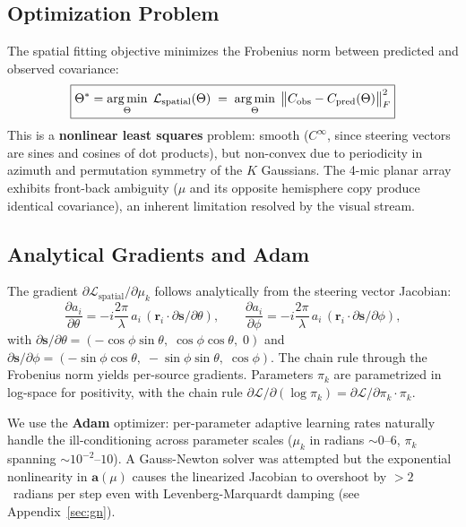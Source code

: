\documentclass{article}
\begin{document}
\subsection{Optimization Problem}
The spatial fitting objective minimizes the Frobenius norm between predicted and observed covariance:
\begin{equation}
\boxed{\Theta^* = \operatorname*{arg\,min}_{\Theta}\; \mathcal{L}_{\text{spatial}}(\Theta) \;=\; \operatorname*{arg\,min}_{\Theta}\; \big\| C_{\text{obs}} - C_{\text{pred}}(\Theta) \big\|_F^2}
\end{equation}
This is a \textbf{nonlinear least squares} problem: smooth ($C^\infty$, since steering vectors are sines and cosines of dot products), but non-convex due to periodicity in azimuth and permutation symmetry of the $K$ Gaussians. The 4-mic planar array exhibits front-back ambiguity ($\mu$ and its opposite hemisphere copy produce identical covariance), an inherent limitation resolved by the visual stream.

\subsection{Analytical Gradients and Adam}
The gradient $\partial\mathcal{L}_{\text{spatial}} / \partial \mu_k$ follows analytically from the steering vector Jacobian:
\begin{equation}
\frac{\partial a_i}{\partial \theta} = -i \frac{2\pi}{\lambda} \, a_i \, (\mathbf{r}_i \cdot \partial\mathbf{s}/\partial\theta), \qquad
\frac{\partial a_i}{\partial \phi} = -i \frac{2\pi}{\lambda} \, a_i \, (\mathbf{r}_i \cdot \partial\mathbf{s}/\partial\phi),
\end{equation}
with $\partial\mathbf{s}/\partial\theta = (-\cos\phi \sin\theta,\; \cos\phi \cos\theta,\; 0)$ and $\partial\mathbf{s}/\partial\phi = (-\sin\phi \cos\theta,\; -\sin\phi \sin\theta,\; \cos\phi)$. The chain rule through the Frobenius norm yields per-source gradients. Parameters $\pi_k$ are parametrized in log-space for positivity, with the chain rule $\partial\mathcal{L}/\partial(\log\pi_k) = \partial\mathcal{L}/\partial\pi_k \cdot \pi_k$.

We use the \textbf{Adam} optimizer: per-parameter adaptive learning rates naturally handle the ill-conditioning across parameter scales ($\mu_k$ in radians $\sim 0$--$6$, $\pi_k$ spanning $\sim 10^{-2}$--$10$). A Gauss-Newton solver was attempted but the exponential nonlinearity in $\mathbf{a}(\mu)$ causes the linearized Jacobian to overshoot by $>2$~radians per step even with Levenberg-Marquardt damping (see Appendix~\ref{sec:gn}).
\end{document}
